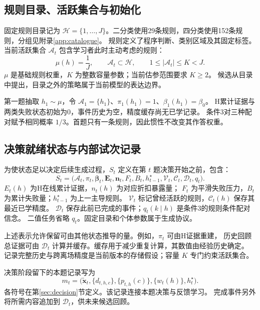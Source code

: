 \documentclass[11pt,a4paper]{article}
\numberwithin{equation}{section}
\newcommand{\A}{\mathcal{A}}
\newcommand{\Hh}{\mathcal{H}}
\begin{document}
\subsection{规则目录、活跃集合与初始化}
固定规则目录记为 $\Hh=\{1,\ldots,J\}$。二分类使用29条规则，四分类使用152条规则，分组见附录\ref{app:catalogue}。
规则定义了程序判断、类别区域及其固定标签。当前活跃集合 $\A_t$ 包含学习者此时主动考虑的规则：
\begin{equation}
\mu(h)=\frac1J,\qquad \A_t\subset\Hh,\qquad
1\leq |\A_t|\leq K<J.
\label{eq:catalogue}
\end{equation}
$\mu$ 是基础规则权重，$K$ 为整数容量参数；当前估参范围要求 $K\geq2$。
候选从目录中提出，目录之外的策略属于当前模型的表达边界。

第一题抽取 $h_1\sim\mu$，令 $\A_1=\{h_1\}$、$\pi_1(h_1)=1$、$\beta_1(h_1)=\beta_0$。
H累计证据与两类失败状态初始为0，事件历史为空，精度缓存尚无已学记录。
条件3对三种配对赋予相同概率 $1/3$。首题只有一条规则，因此惯性不改变其作答权重。

\subsection{决策就绪状态与内部试次记录}
为使状态足以决定后续生成过程，$S_t$ 定义在第 $t$ 题决策开始之前，包含：
\begin{equation}
S_t=\bigl(\A_t,\pi_t,\bm\beta_t,\bm E_t,\bm n_t,
F_t,B_t,h_{t-1}^{\star},\mathcal V_t,\mathcal C_t,\mathcal D_t,q_t\bigr).
\label{eq:full-state}
\end{equation}
$E_t(h)$ 为H在线累计证据，$n_t(h)$ 为对应折扣暴露量；
$F_t$ 为平滑失败压力，$B_t$ 为累计失败量；$h_{t-1}^{\star}$ 为上一主导规则。
$\mathcal V_t$ 标记曾经活跃的规则，$\mathcal C_t(h)$ 保存其最近已学精度。
$\mathcal D_t$ 保存此前已完成的事件；$q_t(k\mid h)$ 是条件3的规则条件配对信念。
二值任务省略 $q_t$。固定目录和个体参数属于生成协议。

上述表示允许保留可由其他状态推导的量。例如，$\pi_t$ 可由H证据重建，
历史回顾总证据可由 $\mathcal D_t$ 计算并缓存。缓存用于减少重复计算，其数值由经验历史确定。
记录完整历史与跨离场精度是当前版本的存储假设；容量 $K$ 专门约束活跃集合。

决策阶段留下的本题记录写为
\begin{equation}
m_t=\bigl(\widetilde{\bm x}_t,\{d_{t,h,c}\},\{p_{t,h}(c)\},
\{w_t(h)\},h_t^{\star}\bigr).
\label{eq:record}
\end{equation}
各符号在第\ref{sec:decision}节定义。该记录连接本题决策与反馈学习。
完成事件另外将所需内容追加到 $\mathcal D_t$，供未来候选回顾。
\end{document}
